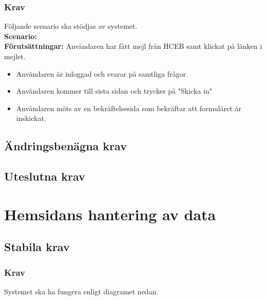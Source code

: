 \documentclass{article}
\begin{document}
        \subsubsection{Krav}
    Följande scenario ska stödjas av systemet.
        \\
       \indent \textbf{Scenario:}
        \\
       \indent \textbf{Förutsättningar:}
       Användaren har fått mejl från HCEB samt klickat på länken i mejlet.
            \begin{itemize}
                \item   Användaren är inloggad och svarar på samtliga frågor.
                \item Användaren kommer till sista sidan och trycker på "Skicka in"
                \item   Användaren möts av en bekräftelsesida som bekräftar att formuläret är inskickat.
            \end{itemize}
     
    
    \subsection{Ändringsbenägna krav}
    \subsection{Uteslutna krav}
    
    \newpage
     \section{Hemsidans hantering av data}
    
    \subsection{Stabila krav}
    \subsubsection{Krav}
    Systemet ska ha fungera enligt diagramet nedan.
    
\end{document}
